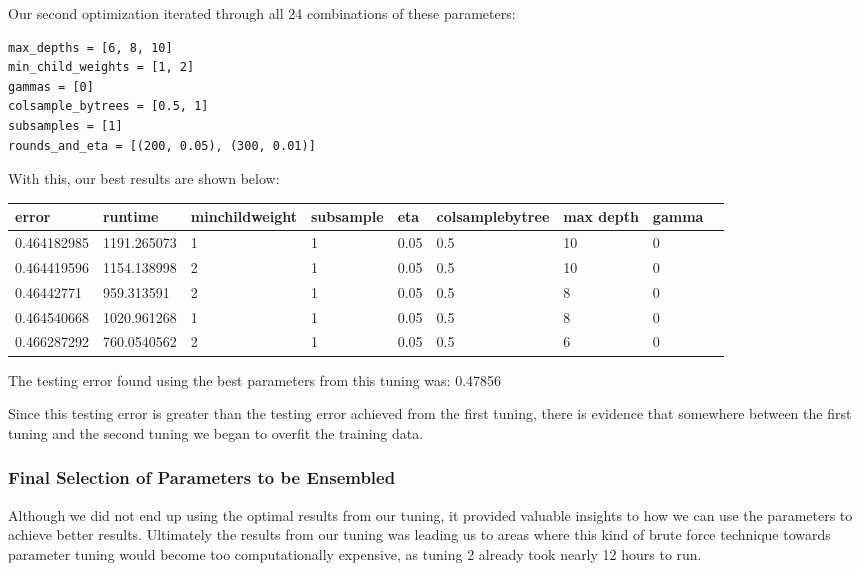 \documentclass[twoside,11pt]{article}
\theoremstyle{definition}
\begin{document}
      Our second optimization iterated through all 24 combinations of these parameters:

      \begin{lstlisting}
max_depths = [6, 8, 10]
min_child_weights = [1, 2]
gammas = [0]
colsample_bytrees = [0.5, 1]
subsamples = [1]
rounds_and_eta = [(200, 0.05), (300, 0.01)]
      \end{lstlisting}

      With this, our best results are shown below:

      \begin{center}
          \begin{tabular}{ | l | l | l | l | l | l | l | l | p{5cm} |}
          \hline
          error & runtime & minchildweight & subsample & eta & colsamplebytree & max depth & gamma \\ \hline
          0.464182985 & 1191.265073 & 1 & 1 & 0.05 & 0.5 & 10 & 0 \\ \hline
          0.464419596 & 1154.138998 & 2 & 1 & 0.05 & 0.5 & 10 & 0 \\ \hline
          0.46442771 & 959.313591 & 2 & 1 & 0.05 & 0.5 & 8 & 0 \\ \hline
          0.464540668 & 1020.961268 & 1 & 1 & 0.05 & 0.5 & 8 & 0 \\ \hline
          0.466287292 & 760.0540562 & 2 & 1 & 0.05 & 0.5 & 6 & 0 \\ \hline
          \end{tabular}
      \end{center}

      The testing error found using the best parameters from this tuning was: 0.47856

      Since this testing error is greater than the testing error achieved from the first tuning, there is evidence that somewhere between the first tuning and the second tuning we began to overfit the training data.

    \subsubsection{Final Selection of Parameters to be Ensembled}

      Although we did not end up using the optimal results from our tuning, it provided valuable insights to how we can use the parameters to achieve better results. Ultimately the results from our tuning was leading us to areas where this kind of brute force technique towards parameter tuning would become too computationally expensive, as tuning 2 already took nearly 12 hours to run.
\end{document}
